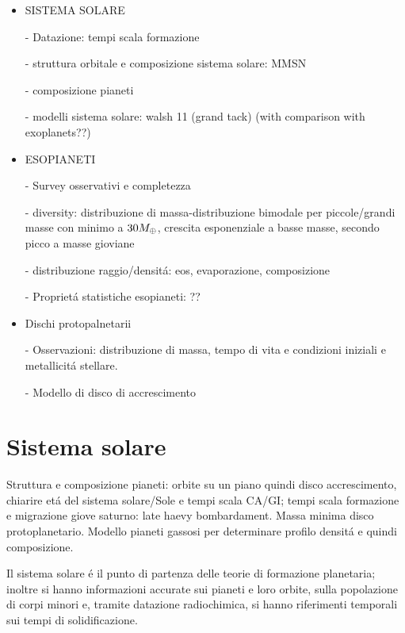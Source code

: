 \begin{workout}
\begin{itemize}
\item SISTEMA SOLARE
\item[-] Datazione: tempi scala formazione
\item[-] struttura orbitale e composizione sistema solare: MMSN
\item[-] composizione pianeti
\item[-] modelli sistema solare: walsh 11 (grand tack) (with comparison with exoplanets??)
\item ESOPIANETI
\item[-] Survey osservativi e completezza
\item[-] diversity: distribuzione di massa-distribuzione bimodale per piccole/grandi masse con minimo a $30M_{\oplus}$, crescita esponenziale a basse masse, secondo picco a masse gioviane
\item[-] distribuzione  raggio/densit\'a: eos, evaporazione, composizione
\item[-] Propriet\'a statistiche esopianeti: ??
\item Dischi protopalnetarii
\item[-] Osservazioni: distribuzione di massa, tempo di vita e condizioni iniziali e metallicit\'a stellare.
\item[-] Modello di disco di accrescimento
\end{itemize}
\end{workout}
{\let\clearpage\relax\let\cleardoublepage\relax
\chapter{Sistema solare}
}

\begin{workout}
Struttura e composizione pianeti: orbite su un piano quindi disco accrescimento, chiarire et\'a del sistema solare/Sole e tempi scala CA/GI; tempi scala formazione e migrazione giove saturno: late haevy bombardament. Massa minima disco protoplanetario. Modello pianeti gassosi per determinare profilo densit\'a e quindi composizione.
\end{workout}

Il sistema solare \'e il punto di partenza delle teorie di formazione planetaria; inoltre si hanno informazioni accurate sui pianeti e loro orbite, sulla popolazione di corpi minori e, tramite datazione radiochimica, si hanno riferimenti temporali sui tempi di solidificazione.

